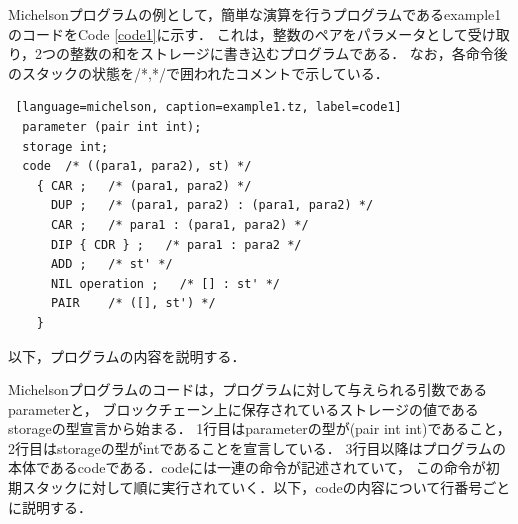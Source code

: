 \documentclass{kuisthesis}
\begin{document}
Michelsonプログラムの例として，簡単な演算を行うプログラムであるexample1のコードをCode \ref{code1}に示す．
これは，整数のペアをパラメータとして受け取り，2つの整数の和をストレージに書き込むプログラムである．
なお，各命令後のスタックの状態を/*,*/で囲われたコメントで示している．
\\
\begin{lstlisting} [language=michelson, caption=example1.tz, label=code1]
  parameter (pair int int); 
  storage int;
  code  /* ((para1, para2), st) */
    { CAR ;   /* (para1, para2) */
      DUP ;   /* (para1, para2) : (para1, para2) */
      CAR ;   /* para1 : (para1, para2) */
      DIP { CDR } ;   /* para1 : para2 */
      ADD ;   /* st' */
      NIL operation ;   /* [] : st' */
      PAIR    /* ([], st') */
    }
\end{lstlisting}

以下，プログラムの内容を説明する．

Michelsonプログラムのコードは，プログラムに対して与えられる引数であるparameterと，
ブロックチェーン上に保存されているストレージの値であるstorageの型宣言から始まる．
1行目はparameterの型が(pair int int)であること，2行目はstorageの型がintであることを宣言している．
3行目以降はプログラムの本体であるcodeである．codeには一連の命令が記述されていて，
この命令が初期スタックに対して順に実行されていく．以下，codeの内容について行番号ごとに説明する．
\end{document}
